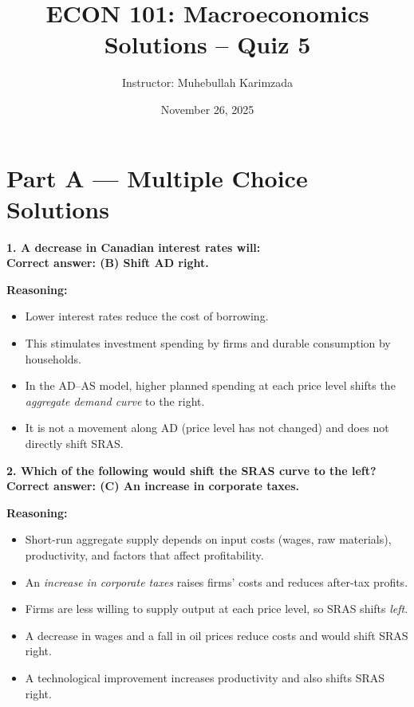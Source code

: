 \documentclass[12pt]{article}
\title{ECON 101: Macroeconomics \\ Solutions -- Quiz 5}
\author{Instructor: Muhebullah Karimzada}
\date{November 26,  2025}
\begin{document}
\maketitle

\section*{Part A --- Multiple Choice Solutions}


\textbf{1. A decrease in Canadian interest rates will:}\\
\textbf{Correct answer: (B) Shift AD right.}

\textbf{Reasoning:}
\begin{itemize}
    \item Lower interest rates reduce the cost of borrowing.
    \item This stimulates investment spending by firms and durable consumption by households.
    \item In the AD--AS model, higher planned spending at each price level shifts the \emph{aggregate demand curve} to the right.
    \item It is not a movement along AD (price level has not changed) and does not directly shift SRAS.
\end{itemize}

\bigskip

\textbf{2. Which of the following would shift the SRAS curve to the left?}\\
\textbf{Correct answer: (C) An increase in corporate taxes.}

\textbf{Reasoning:}
\begin{itemize}
    \item Short-run aggregate supply depends on input costs (wages, raw materials), productivity, and factors that affect profitability.
    \item An \emph{increase in corporate taxes} raises firms' costs and reduces after-tax profits.
    \item Firms are less willing to supply output at each price level, so SRAS shifts \emph{left}.
    \item A decrease in wages and a fall in oil prices reduce costs and would shift SRAS right.
    \item A technological improvement increases productivity and also shifts SRAS right.
\end{itemize}
\end{document}
